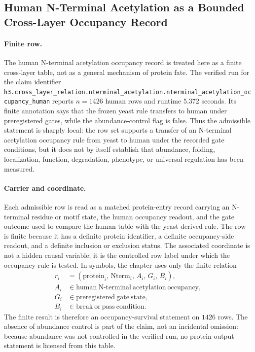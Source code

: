 
\subsection{Human N-Terminal Acetylation as a Bounded Cross-Layer Occupancy Record}
\label{sec:bioreality-human-nterminal-acetylation-occupancy}

\paragraph{Finite row.}
The human N-terminal acetylation occupancy record is treated here as a finite cross-layer table, not as a general mechanism of protein fate. The verified run for the claim identifier \texttt{h3.cross\_layer\_relation.nterminal\_acetylation.nterminal\_acetylation\_occupancy\_human} reports $n=1426$ human rows and runtime $5.372$ seconds. Its finite annotation says that the frozen yeast rule transfers to human under preregistered gates, while the abundance-control flag is false. Thus the admissible statement is sharply local: the row set supports a transfer of an N-terminal acetylation occupancy rule from yeast to human under the recorded gate conditions, but it does not by itself establish that abundance, folding, localization, function, degradation, phenotype, or universal regulation has been measured.

\paragraph{Carrier and coordinate.}
Each admissible row is read as a matched protein-entry record carrying an N-terminal residue or motif state, the human occupancy readout, and the gate outcome used to compare the human table with the yeast-derived rule. The row is finite because it has a definite protein identifier, a definite occupancy-side readout, and a definite inclusion or exclusion status. The associated coordinate is not a hidden causal variable; it is the controlled row label under which the occupancy rule is tested. In symbols, the chapter uses only the finite relation
$$
\begin{aligned}
  r_i &= (\mathrm{protein}_i,\, \mathrm{Nterm}_i,\, A_i,\, G_i,\, B_i),\\
  A_i &\in \mathrm{human\ N\text{-}terminal\ acetylation\ occupancy},\\
  G_i &\in \mathrm{preregistered\ gate\ state},\\
  B_i &\in \mathrm{break\ or\ pass\ condition}.
\end{aligned}
$$
The finite result is therefore an occupancy-survival statement on $1426$ rows. The absence of abundance control is part of the claim, not an incidental omission: because abundance was not controlled in the verified run, no protein-output statement is licensed from this table.


